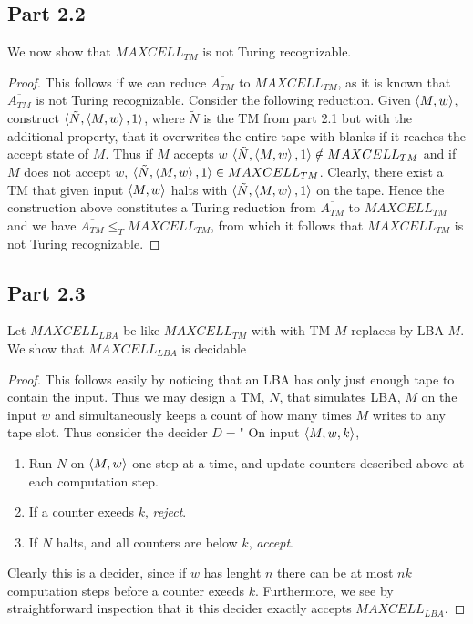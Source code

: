 \documentclass[a4paper,11pt]{article}
\numberwithin{equation}{section}
\begin{document}
	\subsection*{Part 2.2}
	We now show that $ MAXCELL_{TM} $ is not Turing recognizable. \begin{proof}
		This follows if we can reduce $ \overline{A_{TM}} $ to $ MAXCELL_{TM} $, as it is known that $ \overline{A_{TM}} $ is not Turing recognizable. Consider the following reduction. Given $ \braket{M,w} $, construct $ \braket{\tilde{N},\braket{M,w},1} $, where $ \tilde{N} $ is the TM from part 2.1  but with the additional property, that it overwrites the entire tape with blanks if it reaches the accept state of $ M $. Thus if $ M $ accepts $ w $ $ \braket{\tilde{N},\braket{M,w},1}\notin MAXCELL_{TM} $ and if $ M $ does not accept $ w $, $ \braket{\tilde{N},\braket{M,w},1}\in MAXCELL_{TM} $. Clearly, there exist a TM that given input $ \braket{M,w} $ halts with $ \braket{\tilde{N},\braket{M,w},1}  $ on the tape. Hence the construction above constitutes a Turing reduction from $ \overline{A_{TM}} $ to $ MAXCELL_{TM}  $ and we have $ \overline{A_{TM}}\leq_T MAXCELL_{TM}  $, from which it follows that $ MAXCELL_{TM} $ is not Turing recognizable.
	\end{proof}
	
	\subsection*{Part 2.3}
	Let $ MAXCELL_{LBA} $ be like $ MAXCELL_{TM} $ with with TM $ M $ replaces by LBA $ M $. We show that $ MAXCELL_{LBA} $ is decidable\begin{proof}
		This follows easily by noticing that an LBA has only just enough tape to contain the input. Thus we may design a TM, $ N $, that simulates LBA, $ M $ on the input $ w $ and simultaneously keeps a count of how many times $ M $ writes to any tape slot. Thus consider the decider $ D= $" On input $ \braket{M,w,k} $, 
		\begin{enumerate}
			\item Run $ N $ on $ \braket{M,w} $ one step at a time, and update counters described above at each computation step.
			\item If a counter exeeds $ k $, \emph{reject}.
			\item If $ N $ halts, and all counters are below $ k $, \emph{accept}.
		\end{enumerate} 
		Clearly this is a decider, since if $ w $ has lenght $ n $ there can be at most $ nk $ computation steps before a counter exeeds $ k $. Furthermore, we see by straightforward inspection that it this decider exactly accepts $ MAXCELL_{LBA} $.
	\end{proof}
	
\end{document}
